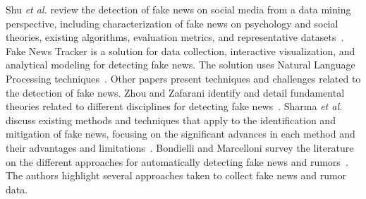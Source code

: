 \documentclass{ieeeaccess}
\begin{document}
Shu \textit {et al.} review the detection of fake news on social media from a data mining perspective, including characterization of fake news on psychology and social theories, existing algorithms, evaluation metrics, and representative datasets~\cite{shu2017fake}. Fake News Tracker is a solution for data collection, interactive visualization, and analytical modeling for detecting fake news. The solution uses Natural Language Processing techniques~\cite{shu2019fakenewstracker}.
%
Other papers present techniques and challenges related to the detection of fake news. Zhou and Zafarani identify and detail fundamental theories related to different disciplines for detecting fake news~\cite{zhou2018fake}. Sharma \textit{et al.} discuss existing methods and techniques that apply to the identification and mitigation of fake news, focusing on the significant advances in each method and their advantages and limitations~\cite{sharma2019combating}. Bondielli and Marcelloni survey the literature on the different approaches for automatically detecting fake news and rumors~\cite{BONDIELLI201938}. The authors highlight several approaches taken to collect fake news and rumor data.
\end{document}
